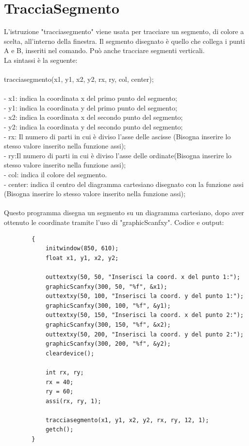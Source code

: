 \documentclass[12pt]{book}
\begin{document}
		\section{TracciaSegmento}
					L'istruzione "tracciasegmento" viene usata per tracciare un segmento, di colore a scelta, all'interno della finestra. Il segmento disegnato è quello che collega i punti A e B, inseriti nel comando. Può anche tracciare segmenti verticali.
		\\La sintassi è la seguente:
		\\
		\\
		\Large tracciasegmento(x1, y1, x2, y2, rx, ry, col, center);
		\normalsize
		\\
		\\- x1: indica la coordinata x del primo punto del segmento;
		\\- y1: indica la coordinata y del primo punto del segmento;
		\\- x2: indica la coordinata x del secondo punto del segmento;
		\\- y2: indica la coordinata y del secondo punto del segmento;
		\\- rx: Il numero di parti in cui è diviso l'asse delle ascisse (Bisogna inserire lo stesso valore inserito nella funzione assi);
		\\- ry:Il numero di parti in cui è diviso l'asse delle ordinate(Bisogna inserire lo stesso valore inserito nella funzione assi);
		\\- col: indica il colore del segmento.
		\\- center: indica il centro del diagramma cartesiano disegnato con la funzione assi (Bisogna inserire lo stesso valore inserito nella funzione assi);
		\\\\
		Questo programma disegna un segmento su un diagramma cartesiano, dopo aver ottenuto le coordinate tramite l'uso di "graphicScanfxy".
		\newpage
		Codice e output:			
		\begin{lstlisting}
		{
			initwindow(850, 610);
			float x1, y1, x2, y2;
			
			outtextxy(50, 50, "Inserisci la coord. x del punto 1:");
			graphicScanfxy(300, 50, "%f", &x1);
			outtextxy(50, 100, "Inserisci la coord. y del punto 1:");
			graphicScanfxy(300, 100, "%f", &y1);
			outtextxy(50, 150, "Inserisci la coord. x del punto 2:");
			graphicScanfxy(300, 150, "%f", &x2);
			outtextxy(50, 200, "Inserisci la coord. y del punto 2:");
			graphicScanfxy(300, 200, "%f", &y2);
			cleardevice();
			
			int rx, ry;
			rx = 40;
			ry = 60;
			assi(rx, ry, 1);
			
			tracciasegmento(x1, y1, x2, y2, rx, ry, 12, 1);
			getch();
		}
		\end{lstlisting}
	
\end{document}

